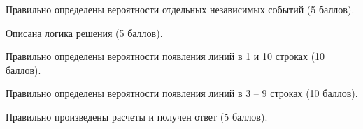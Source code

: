 \markSection

Правильно определены вероятности отдельных независимых событий (5 баллов). 

Описана логика решения (5 баллов). 

Правильно определены вероятности появления линий в 1 и 10 строках (10 баллов). 

Правильно определены вероятности появления линий в 3 – 9 строках (10 баллов). 

Правильно произведены расчеты и получен ответ (5 баллов).
